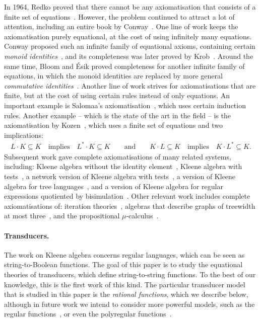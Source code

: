 In 1964, Redko proved that there cannot be any  axiomatisation that consists of a finite set of equations~\cite{Redko1964}. However, the problem continued to attract a lot of attention, including an entire book by Conway~\cite{Conway1971}. One line of work keeps the axiomatisation purely equational, at the cost of using infinitely many equations. Conway proposed such an infinite family of equational axioms, containing certain \emph{monoid identities}~\cite[pp.~116--119]{Conway1971}, and its completeness was later proved by Krob~\cite[Theorem 0.1]{Krob1991}. Around the same time, Bloom and \'Esik proved completeness for another infinite family of equations, in which the monoid identities are replaced by more general \emph{commutative identities}~\cite[Corollary 2.14]{Bloom_Ésik_1993}. Another line of work strives for axiomatisations that are finite, but at the cost of using certain rules instead of only equations. An important example is Salomaa's axiomatisation~\cite[Theorems 1 and 2]{Salomaa1966}, which uses certain induction rules. Another example -- which is the state of the art in the field -- is the axiomatisation by Kozen~\cite[Theorem 5.5]{Kozen1994}, which uses a finite set of equations and two implications: 
\begin{align*}
L \cdot K \subseteq K \quad \text{implies} \quad L^* \cdot K \subseteq K
\qquad \text{and} \qquad 
K \cdot L \subseteq K \quad \text{implies} \quad K \cdot L^* \subseteq K.
\end{align*}
Subsequent work gave complete axiomatisations of many related systems, including: Kleene algebra without the identity element~\cite[Theorems 10 and 11]{DoumanePous2018}, Kleene algebra with tests~\cite[Theorem 8]{KozenSmith1996}, a network version of Kleene algebra with tests~\cite[Section 4]{Anderson2014NetKAT}, a version of Kleene  
algebra for tree languages~\cite[Theorem 8]{Esik1998}, and a version of Kleene algebra for regular expressions quotiented by bisimulation~\cite[Theorem 5.1]{Grabmayer2022}. Other relevant work includes complete axiomatisations of: iteration theories~\cite[Chapter 14]{BloomEsik1993}, algebras that describe graphs of treewidth at most three~\cite[Theorem 5.5]{DoumaneHumeauPous2024}, and the propositional $\mu$-calculus~\cite[Theorem 37]{Walukiewicz2000}.

\paragraph*{Transducers.}
The work on Kleene algebra concerns regular languages, which can be seen as string-to-Boolean functions. The goal of this paper is to study the equational theories of transducers,  which define string-to-string functions. To the best of our knowledge, this is the first work of this kind.
The particular transducer model that is studied in this paper is the \emph{rational functions}, which we describe below, although in future work we intend to consider more powerful models, such as the regular functions~\cite[Part C]{Bojanczyk2026}, or even the polyregular functions~\cite{Bojanczyk2022}.

